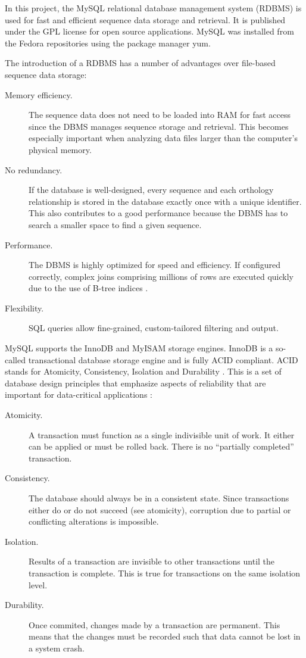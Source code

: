 In this project, the MySQL relational database management system (RDBMS) is used
for fast and efficient sequence data storage and retrieval. It is published
under the GPL license for open source applications. MySQL was installed from the
Fedora repositories using the package manager yum.

The introduction of a RDBMS has a number of advantages over file-based sequence
data storage:

\begin{description}
	\item[Memory efficiency.] The sequence data does not need to be loaded into
		RAM for fast access since the DBMS manages sequence storage and retrieval.
		This becomes especially important when analyzing data files larger than the
		computer's physical memory.
	\item[No redundancy.] If the database is well-designed, every sequence and
		each orthology relationship is stored in the database exactly once with a
		unique identifier. This also contributes to a good performance because the
		DBMS has to search a smaller space to find a given sequence.
	\item[Performance.] The DBMS is highly optimized for speed and efficiency. If
		configured correctly, complex joins comprising millions of rows are executed
		quickly due to the use of B-tree indices \citep{comer1979}.
	\item[Flexibility.] SQL queries allow fine-grained, custom-tailored filtering
		and output.
\end{description}

MySQL supports the InnoDB and MyISAM storage engines. InnoDB is a so-called
transactional database storage engine and is fully ACID compliant. ACID stands
for Atomicity, Consistency, Isolation and Durability \citep{haerder1983}.  This
is a set of database design principles that emphasize aspects of reliability
that are important for data-critical applications \citep{schwartz2012}:

\begin{description}
	\item[Atomicity.] A transaction must function as a single indivisible unit of
		work. It either can be applied or must be rolled back. There is no
		``partially completed'' transaction.
	\item[Consistency.] The database should always be in a consistent state. Since
		transactions either do or do not succeed (see atomicity), corruption due to
		partial or conflicting alterations is impossible.
	\item[Isolation.] Results of a transaction are invisible to other
		transactions until the transaction is complete. This is true for
		transactions on the same isolation level.
	\item[Durability.] Once commited, changes made by a transaction are permanent.
		This means that the changes must be recorded such that data cannot be lost
		in a system crash. 
\end{description}

